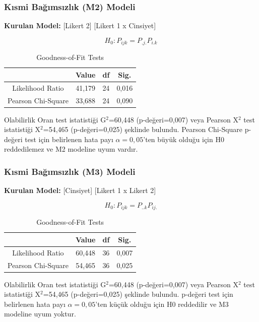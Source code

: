 \documentclass{article}
\begin{document}
\vspace{10pt}
\subsubsection{Kısmi Bağımsızlık (M2) Modeli}
\textbf{Kurulan Model:} [Likert 2] [Likert 1 x Cinsiyet]

$$H_0: P_{ijk} = P_{.j.}P_{i.k}$$

\begin{table}[h]
    \centering
    \caption{Goodness-of-Fit Tests}
    \begin{tabular}{|c|c|c|c|}
         \hline
          & \textbf{Value} & \textbf{df} & \textbf{Sig.} \\
         \hline
         Likelihood Ratio & 41,179 & 24 & 0,016 \\
         Pearson Chi-Square & 33,688 & 24 & 0,090 \\
         \hline
    \end{tabular}
    \label{tab:goodness-of-fit3}
\end{table}
Olabilirlik Oran test istatistiği G$^2$=60,448 (p-değeri=0,007) veya Pearson X$^2$ test istatistiği X$^2$=54,465 (p-değeri=0,025) şeklinde bulundu. Pearson Chi-Square p-değeri test için belirlenen hata payı $\alpha=0,05$'ten büyük olduğu için H0 reddedilemez ve M2 modeline uyum vardır.

\vspace{10pt}
\subsubsection{Kısmi Bağımsızlık (M3) Modeli}
\textbf{Kurulan Model:} [Cinsiyet] [Likert 1 x Likert 2]

$$H_0: P_{ijk} = P_{..k}P_{ij.}$$

\begin{table}[h]
    \centering
    \caption{Goodness-of-Fit Tests}
    \begin{tabular}{|c|c|c|c|}
         \hline
          & \textbf{Value} & \textbf{df} & \textbf{Sig.} \\
         \hline
         Likelihood Ratio & 60,448 & 36 & 0,007 \\
         Pearson Chi-Square & 54,465 & 36 & 0,025 \\
         \hline
    \end{tabular}
    \label{tab:goodness-of-fit4}
\end{table}
Olabilirlik Oran test istatistiği G$^2$=60,448 (p-değeri=0,007) veya Pearson X$^2$ test istatistiği X$^2$=54,465 (p-değeri=0,025) şeklinde bulundu. p-değeri test için belirlenen hata payı $\alpha=0,05$'ten küçük olduğu için H0 reddedilir ve M3 modeline uyum yoktur.
\end{document}
